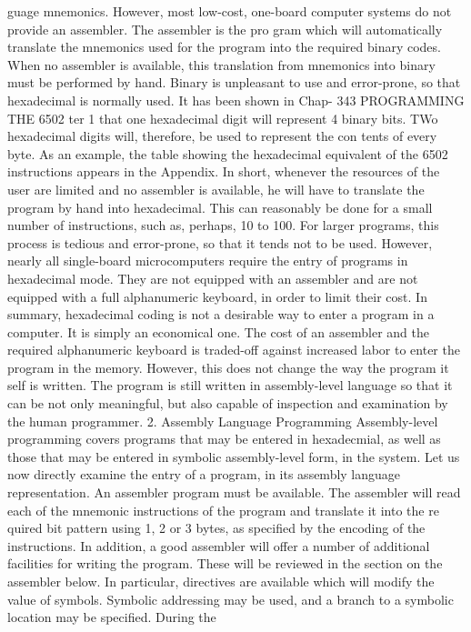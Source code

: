 {{{{{{{{{{{{{{{{{{{{{{{{{{{{{{{{{{{{{{{{{{{{{{{{{{{{{{{{{{{{{{{{{{{{{{{{{{{{{{{{{{{{{{{{{{{{{{{{{{{{{{{{{{{{{{{{{{{{{{{{{{{{{{{{{{{{{{{{{{{{guage mnemonics. However, most low-cost, one-board computer
systems do not provide an assembler. The assembler is the pro
gram which will automatically translate the mnemonics used for
the program into the required binary codes. When no assembler is
available, this translation from mnemonics into binary must be
performed by hand. Binary is unpleasant to use and error-prone,
so that hexadecimal is normally used. It has been shown in Chap-
343
PROGRAMMING THE 6502
ter 1 that one hexadecimal digit will represent 4 binary bits. TWo
hexadecimal digits will, therefore, be used to represent the con
tents of every byte. As an example, the table showing the
hexadecimal equivalent of the 6502 instructions appears in the
Appendix.
In short, whenever the resources of the user are limited and no
assembler is available, he will have to translate the program by
hand into hexadecimal. This can reasonably be done for a small
number of instructions, such as, perhaps, 10 to 100. For larger
programs, this process is tedious and error-prone, so that it tends
not to be used. However, nearly all single-board microcomputers
require the entry of programs in hexadecimal mode. They are not
equipped with an assembler and are not equipped with a full
alphanumeric keyboard, in order to limit their cost.
In summary, hexadecimal coding is not a desirable way to enter
a program in a computer. It is simply an economical one. The cost
of an assembler and the required alphanumeric keyboard is
traded-off against increased labor to enter the program in the
memory. However, this does not change the way the program it
self is written. The program is still written in assembly-level language
so that it can be not only meaningful, but also capable of inspection
and examination by the human programmer.
2. Assembly Language Programming
Assembly-level programming covers programs that may be entered
in hexadecmial, as well as those that may be entered in symbolic
assembly-level form, in the system. Let us now directly examine the
entry of a program, in its assembly language representation. An
assembler program must be available. The assembler will read each of
the mnemonic instructions of the program and translate it into the re
quired bit pattern using 1, 2 or 3 bytes, as specified by the encoding of
the instructions. In addition, a good assembler will offer a number of
additional facilities for writing the program. These will be reviewed in
the section on the assembler below. In particular, directives are available
which will modify the value of symbols. Symbolic addressing may be used,
and a branch to a symbolic location may be specified. During the
}}}}}}}}}}}}}}}}}}}}}}}}}}}}}}}}}}}}}}}}}}}}}}}}}}}}}}}}}}}}}}}}}}}}}}}}}}}}}}}}}}}}}}}}}}}}}}}}}}}}}}}}}}}}}}}}}}}}}}}}}}}}}}}}}}}}}}}}}}}}
